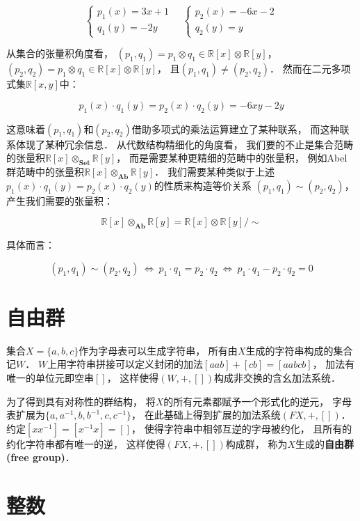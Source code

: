 \documentclass[10pt, openany]{book}
\begin{document}
$$
\begin{cases}
p_1(x) = 3x + 1 \\
q_1(y) = - 2y
\end{cases} \quad
\begin{cases}
p_2(x) = -6x - 2 \\
q_2(y) = y
\end{cases}
$$

从集合的张量积角度看，
$(p_1,q_1) = p_1 \otimes q_1 \in \mathbb R[x] \otimes \mathbb R[y]$，
$(p_2,q_2) = p_1 \otimes q_1 \in \mathbb R[x] \otimes \mathbb R[y]$，
且$(p_1,q_1) \neq (p_2,q_2)$．
然而在二元多项式集$\mathbb R[x,y]$中：

$$
p_1(x) \cdot q_1(y) = p_2(x) \cdot q_2(y) = - 6xy - 2y 
$$

这意味着$(p_1,q_1)$和$(p_2,q_2)$借助多项式的乘法运算建立了某种联系，
而这种联系体现了某种冗余信息．
从代数结构精细化的角度看，
我们要的不止是集合范畴的张量积$\mathbb R[x] \otimes_\textbf{Set} \mathbb R[y]$，
而是需要某种更精细的范畴中的张量积，
例如Abel群范畴中的张量积$\mathbb R[x] \otimes_\textbf{Ab} \mathbb R[y]$．
我们需要某种类似于上述$p_1(x) \cdot q_1(y) = p_2(x) \cdot q_2(y) $的性质来构造等价关系
$(p_1,q_1) \sim (p_2,q_2)$，
产生我们需要的张量积：

$$
\mathbb R[x] \otimes_\textbf{Ab} \mathbb R[y]
= \mathbb R[x] \otimes \mathbb R[y]/\sim
$$

具体而言：

$$
(p_1,q_1) \sim (p_2,q_2) \ \Longleftrightarrow \ 
p_1 \cdot q_1 = p_2 \cdot q_2 \ \Longleftrightarrow \ 
p_1 \cdot q_1 - p_2 \cdot q_2 = 0
$$


\section{自由群}

集合$X=\{a,b,c\}$作为字母表可以生成字符串，
所有由$X$生成的字符串构成的集合记$W$．
$W$上用字符串拼接可以定义封闭的加法$[aab] + [cb] = [aabcb]$，
加法有唯一的单位元即空串$[]$，
这样使得$(W,+,[])$构成非交换的含幺加法系统．

为了得到具有对称性的群结构，
将$X$的所有元素都赋予一个形式化的逆元，
字母表扩展为$\{a,a^{-1},b,b^{-1},c,c^{-1}\}$，
在此基础上得到扩展的加法系统$(FX,+,[])$．
约定$[xx^{-1}] = [x^{-1}x] = []$，
使得字符串中相邻互逆的字母被约化，
且所有的约化字符串都有唯一的逆，
这样使得$(FX,+,[])$构成群，
称为$X$生成的\textbf{自由群(free group)}．




\section{整数}
\end{document}
